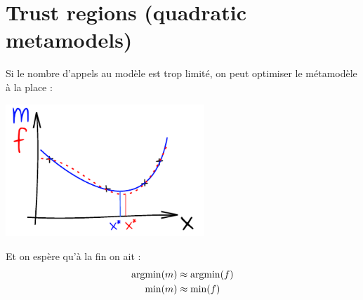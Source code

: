\documentclass{beamer}
\newcommand{\argmin}{\operatornamewithlimits{argmin}}
\begin{document}
\section[Trust regions]{Trust regions (quadratic metamodels)}
\begin{frame}{}
Si le nombre d'appels au modèle est trop limité, on peut optimiser le métamodèle à la place :

\begin{center}
\includegraphics[height=5cm]{figures/ink_mf}
\end{center}
Et on espère qu'à la fin on ait :
\begin{equation*}
	\begin{split}
		\argmin(m) & \approx \argmin(f)\\
		\min(m) & \approx \min(f)\\
	\end{split}
\end{equation*}
\end{frame}
\end{document}
